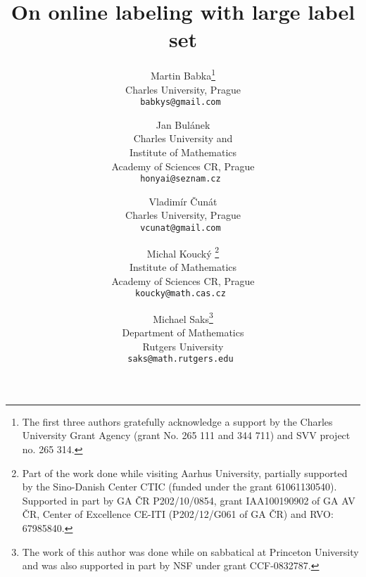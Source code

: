 \documentclass[11pt]{article}
\begin{document}
\title{On online labeling with large label set}

\author{
Martin Babka\thanks{The first three authors gratefully acknowledge a support by the Charles University Grant Agency (grant No. 265 111 and 344 711) and SVV project no. 265 314.}\\
{Charles University, Prague}\\
\tt{babkys@gmail.com}
\and
Jan Bul\'anek\\
{Charles University and }\\
{Institute of Mathematics}\\
{Academy of Sciences CR, Prague}\\
\tt{honyai@seznam.cz}
\and
Vladim\'ir \v{C}un\'at\\
{Charles University, Prague}\\
\tt{vcunat@gmail.com}
\and
Michal Kouck\'{y}
\thanks{Part of the work done while visiting Aarhus University, partially supported by the Sino-Danish Center CTIC (funded under the grant 61061130540). Supported in part by GA \v{C}R P202/10/0854, grant IAA100190902 of GA AV \v{C}R, Center of Excellence CE-ITI (P202/12/G061 of GA \v{C}R) and RVO: 67985840.}\\
{Institute of Mathematics}\\
{Academy of Sciences CR, Prague}\\
\tt{koucky@math.cas.cz}
\and
Michael Saks\thanks{The work of this author was done while on sabbatical at Princeton University and
was also supported in part by NSF under  grant CCF-0832787.}\\
{Department of Mathematics}\\
{Rutgers University}\\
\tt{saks@math.rutgers.edu}
}

\maketitle
\end{document}
